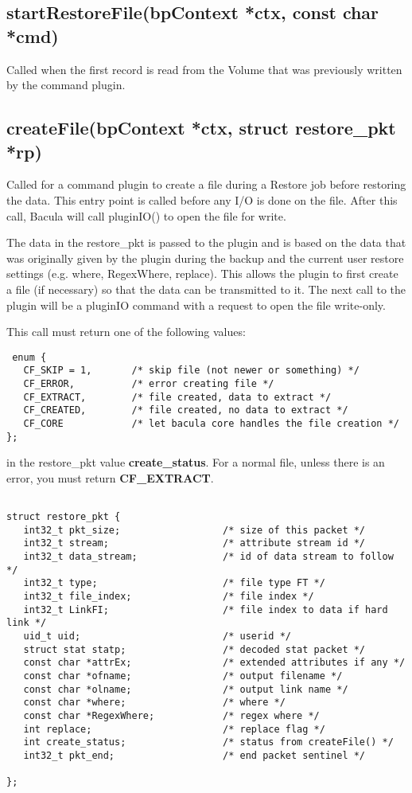 \subsection{startRestoreFile(bpContext *ctx, const char *cmd)}
Called when the first record is read from the Volume that was 
previously written by the command plugin.

\subsection{createFile(bpContext *ctx, struct restore\_pkt *rp)}
Called for a command plugin to create a file during a Restore job before 
restoring the data. 
This entry point is called before any I/O is done on the file.  After
this call, Bacula will call pluginIO() to open the file for write.

The data in the 
restore\_pkt is passed to the plugin and is based on the data that was
originally given by the plugin during the backup and the current user
restore settings (e.g. where, RegexWhere, replace).  This allows the
plugin to first create a file (if necessary) so that the data can
be transmitted to it.  The next call to the plugin will be a
pluginIO command with a request to open the file write-only.

This call must return one of the following values:

\begin{verbatim}
 enum {
   CF_SKIP = 1,       /* skip file (not newer or something) */
   CF_ERROR,          /* error creating file */
   CF_EXTRACT,        /* file created, data to extract */
   CF_CREATED,        /* file created, no data to extract */
   CF_CORE            /* let bacula core handles the file creation */
};
\end{verbatim}

in the restore\_pkt value {\bf create\_status}.  For a normal file,
unless there is an error, you must return {\bf CF\_EXTRACT}.

\begin{verbatim}
 
struct restore_pkt {
   int32_t pkt_size;                  /* size of this packet */
   int32_t stream;                    /* attribute stream id */
   int32_t data_stream;               /* id of data stream to follow */
   int32_t type;                      /* file type FT */
   int32_t file_index;                /* file index */
   int32_t LinkFI;                    /* file index to data if hard link */
   uid_t uid;                         /* userid */
   struct stat statp;                 /* decoded stat packet */
   const char *attrEx;                /* extended attributes if any */
   const char *ofname;                /* output filename */
   const char *olname;                /* output link name */
   const char *where;                 /* where */
   const char *RegexWhere;            /* regex where */
   int replace;                       /* replace flag */
   int create_status;                 /* status from createFile() */
   int32_t pkt_end;                   /* end packet sentinel */

};
\end{verbatim}

